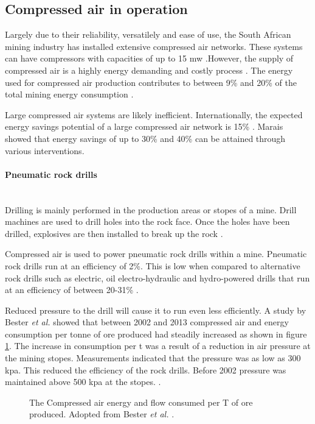 	\subsection{Compressed air in operation}
		Largely due to their reliability, versatilely and ease of use, the South African mining industry has installed extensive compressed air networks. These systems can have compressors with capacities of up to 15 \gls{mw} \cite{Marais2012PhD}.However, the supply of compressed air is a highly energy demanding and costly process \cite{padachi2009energy}.  The energy used for compressed air production contributes to between 9\% and 20\% of the total mining energy consumption	\cite{Eskom2010Energy,du2011development}. 
		\par
		Large compressed air systems are likely inefficient. Internationally, the expected energy savings potential of a large compressed air network is 15\% \cite{neale2009compressed}. Marais \cite{marais2013simplification} showed that energy savings of up to 30\% and 40\% can be attained through various interventions. 
		\paragraph{Pneumatic rock drills}\leavevmode\\
	 		Drilling is mainly performed in the production areas or stopes of a mine. Drill machines are used to drill holes into the rock face. Once the holes have been drilled, explosives are then installed to break up the rock \cite{van2008development}.
	 		\par
	  		Compressed air is used to power pneumatic rock drills within a mine. Pneumatic rock drills run at an efficiency of 2\%. This is low when compared to alternative rock drills such as electric, oil electro-hydraulic and hydro-powered drills that run at an efficiency of between 20-31\% \cite{fraser2008saving,vanTonder2010Masters}. 
	  		\par
	  		Reduced pressure to the drill will cause it to run even less efficiently. A study by  Bester \textit{et al.} showed that between 2002 and 2013 compressed air and energy consumption per tonne of ore produced had steadily increased as shown in figure \ref{fig: Compressed energy and air flow per ton}. The increase in consumption per \gls{t} was a result of a reduction in air pressure at the mining stopes. Measurements indicated that the pressure was as low as 300 \gls{kpa}. This reduced the efficiency of the rock drills. Before 2002 pressure was maintained above 500 \gls{kpa} at the stopes.  .\cite{bester2013effect} \par
			\begin{figure}[h]
				\centering
				\fbox{}
				\caption[The Compressed air energy and flow consumed per T of ore produced.]{The Compressed air energy and flow consumed per T of ore produced. Adopted from Bester \textit{et al.} \cite{bester2013effect}.}
				\label{fig: Compressed energy and air flow per ton}
			\end{figure}
